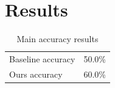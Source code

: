 \documentclass{article}
\begin{document}
\begin{abstract}
Our method improves accuracy from 50.0\% to 60.0\%, a 50.0\% relative improvement.
\end{abstract}
\section{Results}
\begin{table}
\caption{Main accuracy results}
\begin{tabular}{lr}
Baseline accuracy & 50.0\% \\
Ours accuracy & 60.0\% \\
\end{tabular}
\end{table}
\end{document}
